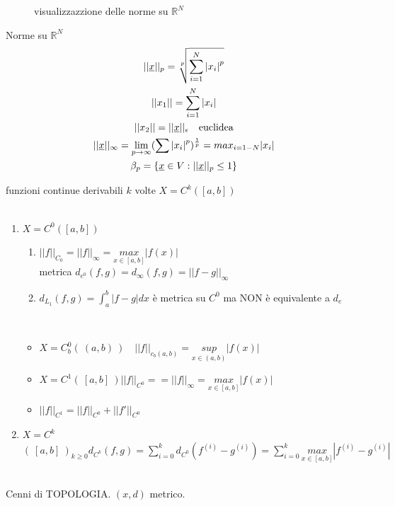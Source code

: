 \documentclass[a4paper, oneside]{article}
\begin{document}
    \begin{figure}[tbh]
    \centering
    
    \caption{visualizzazzione delle norme su $\mathbb{R}^N$}\label{fig:testsvg}
    \end{figure}

\begin{example}
    Norme su $\mathbb{R}^N$
\begin{gather*}
    ||\text{\underbar{$x$}}||_p = \sqrt[p]{\sum_{i=1}^{N}{|x_i|}^p}\\
    ||x_1|| = \sum_{i=1}^{N} |x_i|\\
    ||x_2|| = ||\text{\underbar{$x$}}||_\epsilon \quad \text{euclidea}\\
    ||\text{\underbar{$x$}}||_\infty = \lim_{p \to \infty}(\sum{|x_i|}^p)^{\frac{1}{p}} = max_{i=1-N}|x_i|\\
    \beta_p = \{ \text{\underbar{$x$}} \in V : || \text{\underbar{$x$}}||_p \leq 1\}
\end{gather*}
\end{example}
\begin{example}
    funzioni continue derivabili $k$ volte $X = C^k ([a,b])$\\\\
    \begin{enumerate}[$I)$]
        
         \item $X = C^0([a,b])$ \\
    \begin{enumerate}[$i)$]
        \item $||f||_{C_0} = ||f||_\infty =\underset{{x \in [a,b]}}{max}|f(x)|$\\
            metrica $d_{e^0}(f,g) = d_\infty (f,g) = || f-g||_\infty$
        \item $d_{L_1}(f,g) = \int_{a}^{b} |f-g| dx$ è metrica su $C^0$ ma NON è equivalente a $d_e$
    \end{enumerate}
    \\
    \begin{itemize}
        \item $X = C_b^0 ( \ (a,b) \ ) \quad ||f||_{c_b (a,b)} = \underset{x \in (a,b)}{sup} |f(x)|$
        \item $X = C^1 ( \ [a,b] \ ) || f||_{C^0} == ||f||_\infty = \underset{x \in [a,b]}{max}|f(x)|$
        \item $||f||_{C^1} = ||f||_{C^0} + ||f'||_{C^0}$
    \end{itemize}
    \item $X = C^k$\\
     $( \ [a,b] \ )_{k \geq 0} d_{C^k} (f,g) = \sum_{i=0}^{k} d_{C^0} (f^{(i)} - g^{(i)}) = \sum_{i=0}^{k} \underset{x \in [a,b]}{max}|f^{(i)} - g^{(i)}|$
\end{enumerate}
    \end{example}
\hfil\\
    Cenni di TOPOLOGIA. $(x,d)$ metrico.\\
\end{document}
